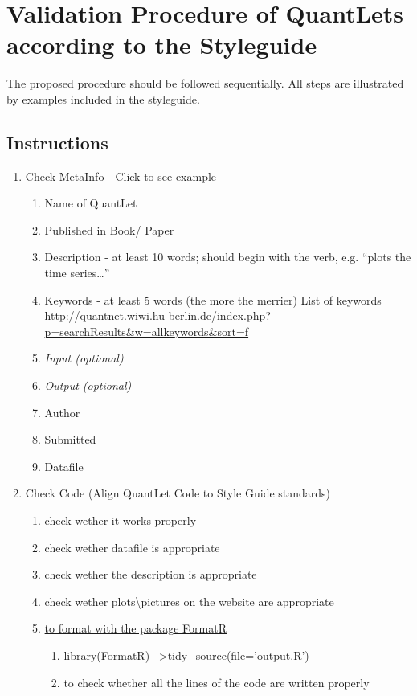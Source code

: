 \documentclass{article}
\begin{document}
\section*{Validation Procedure of QuantLets according to the Styleguide}
The proposed procedure should be followed sequentially. All steps are illustrated by examples included in the styleguide.

\subsection*{Instructions} %
\begin{enumerate}
	\item Check MetaInfo - \label{MetaInfo-ini}\hyperref[MetaInfo]{Click to see example}
	\begin{enumerate}
		\item Name of QuantLet
		\item Published in Book/ Paper
		\item Description - at least 10 words; should begin 			with 			the verb, e.g. “plots the time series…”
		\item Keywords - at least 5 words (the more the 				merrier)
		List of keywords \url{http://quantnet.wiwi.hu-berlin.de/index.php?p=searchResults&w=allkeywords&sort=f}
		\item \textit{Input (optional)}
		\item \textit{Output (optional)}
		\item Author
		\item Submitted
		\item Datafile
	\end{enumerate}
	\item Check Code (Align QuantLet Code to Style Guide 			standards) 
	\begin {enumerate}
		\item check wether it works properly
		\item check wether datafile is appropriate
		\item check wether the description is appropriate
		\item check wether plots\textbackslash pictures on 				the website are appropriate
		\item \label{formatR-ini}\hyperref[formatR]{to format with the package	FormatR}
			\begin{enumerate}
				\item library(FormatR)  --\textgreater 							 tidy\_source(file='output.R')
				\item to check whether all the lines of the 					code are written properly

\end{enumerate}
\end{enumerate}
\end{enumerate}
\end{document}
